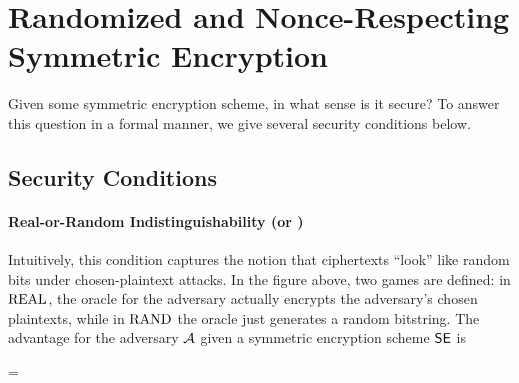 \section{Randomized and Nonce-Respecting Symmetric Encryption}
\label{sec:symenc}

Given some symmetric encryption scheme, in what sense is it secure?  To answer
this question in a formal manner, we give several security conditions below.

\subsection{Security Conditions}

\paragraph{Real-or-Random Indistinguishability (\INDRAND or \ROR)}


Intuitively, this condition captures the notion that ciphertexts ``look'' like
random bits under chosen-plaintext attacks. In the figure above, two
games are defined: in $\textnormal{REAL}$, the oracle for the adversary actually
encrypts the adversary's chosen plaintexts, while in $\textnormal{RAND}$ the oracle
just generates a random bitstring. The advantage for the adversary ${\mathcal A}$ given
a symmetric encryption scheme $\textnormal{\textsf{SE}}$ is

\bnm
\AdvROR{\SE}{\advA} =
\enm

